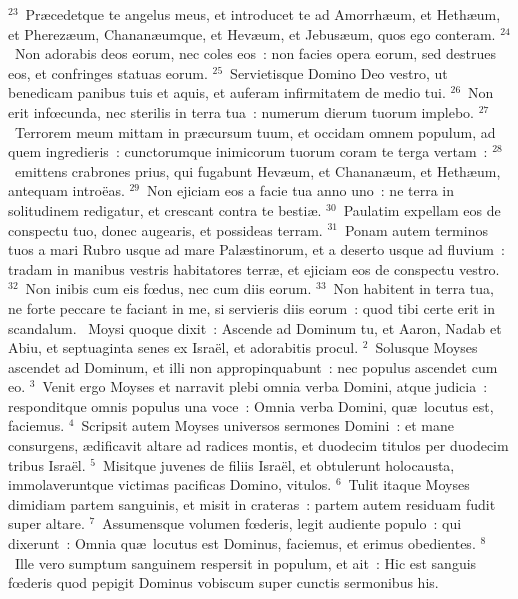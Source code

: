${}^{23}$~Pr\ae cedetque te angelus meus, et introducet te ad Amorrh\ae um, et Heth\ae um, et Pherez\ae um, Chanan\ae umque, et Hev\ae um, et Jebus\ae um, quos ego conteram.
${}^{24}$~Non adorabis deos eorum, nec coles eos~: non facies opera eorum, sed destrues eos, et confringes statuas eorum.
${}^{25}$~Servietisque Domino Deo vestro, ut benedicam panibus tuis et aquis, et auferam infirmitatem de medio tui.
${}^{26}$~Non erit infœcunda, nec sterilis in terra tua~: numerum dierum tuorum implebo.
${}^{27}$~Terrorem meum mittam in pr\ae cursum tuum, et occidam omnem populum, ad quem ingredieris~: cunctorumque inimicorum tuorum coram te terga vertam~:
${}^{28}$~emittens crabrones prius, qui fugabunt Hev\ae um, et Chanan\ae um, et Heth\ae um, antequam intro\"eas.
${}^{29}$~Non ejiciam eos a facie tua anno uno~: ne terra in solitudinem redigatur, et crescant contra te besti\ae .
${}^{30}$~Paulatim expellam eos de conspectu tuo, donec augearis, et possideas terram.
${}^{31}$~Ponam autem terminos tuos a mari Rubro usque ad mare Pal\ae stinorum, et a deserto usque ad fluvium~: tradam in manibus vestris habitatores terr\ae , et ejiciam eos de conspectu vestro.
${}^{32}$~Non inibis cum eis fœdus, nec cum diis eorum.
${}^{33}$~Non habitent in terra tua, ne forte peccare te faciant in me, si servieris diis eorum~: quod tibi certe erit in scandalum.
~Moysi quoque dixit~: Ascende ad Dominum tu, et Aaron, Nadab et Abiu, et septuaginta senes ex Isra\"el, et adorabitis procul.
${}^{2}$~Solusque Moyses ascendet ad Dominum, et illi non appropinquabunt~: nec populus ascendet cum eo.
${}^{3}$~Venit ergo Moyses et narravit plebi omnia verba Domini, atque judicia~: responditque omnis populus una voce~: Omnia verba Domini, qu\ae\ locutus est, faciemus.
${}^{4}$~Scripsit autem Moyses universos sermones Domini~: et mane consurgens, \ae dificavit altare ad radices montis, et duodecim titulos per duodecim tribus Isra\"el.
${}^{5}$~Misitque juvenes de filiis Isra\"el, et obtulerunt holocausta, immolaveruntque victimas pacificas Domino, vitulos.
${}^{6}$~Tulit itaque Moyses dimidiam partem sanguinis, et misit in crateras~: partem autem residuam fudit super altare.
${}^{7}$~Assumensque volumen fœderis, legit audiente populo~: qui dixerunt~: Omnia qu\ae\ locutus est Dominus, faciemus, et erimus obedientes.
${}^{8}$~Ille vero sumptum sanguinem respersit in populum, et ait~: Hic est sanguis fœderis quod pepigit Dominus vobiscum super cunctis sermonibus his.


